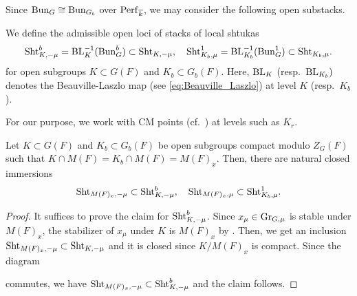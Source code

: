 \documentclass[12pt,reqno]{amsart}
\begin{document}
Since ${\operatorname{Bun}}_G \cong {\operatorname{Bun}}_{G_b}$ over ${\operatorname{Perf}}_{{\overline{k}}}$, we may consider the following open substacks. 

\begin{defi}
    We define the admissible open loci of stacks of local shtukas
    \[
        {\operatorname{Sht}}_{K, -\mu}^b = {\operatorname{BL}}_K^{-1}({\operatorname{Bun}}_G^b) \subset {\operatorname{Sht}}_{K, -\mu}, \quad 
        {\operatorname{Sht}}_{K_b, \mu}^1 = {\operatorname{BL}}_{K_b}^{-1}({\operatorname{Bun}}_G^1) \subset {\operatorname{Sht}}_{K_b, \mu}. 
    \]
    for open subgroups $K \subset G(F)$ and $K_b \subset G_b(F)$. Here, ${\operatorname{BL}}_K$ (resp.\ ${\operatorname{BL}}_{K_b})$ denotes the Beauville-Laszlo map (see \eqref{eq:Beauville_Laszlo}) at level $K$ (resp.\ $K_b$). 
\end{defi}

For our purpose, we work with CM points (cf.\ ) at levels such as $K_r$. 

\begin{lem} \label{lem:CM_points_general_depth}
    Let $K \subset G(F)$ and $K_b \subset G_b(F)$ be open subgroups compact modulo $Z_G(F)$ such that $K \cap M(F) = K_b \cap M(F) = M(F)_x$. Then, there are natural closed immersions
    \[
        {\operatorname{Sht}}_{M(F)_x, -\mu} \subset {\operatorname{Sht}}_{K, -\mu}^b ,\quad 
        {\operatorname{Sht}}_{M(F)_x, \mu} \subset {\operatorname{Sht}}_{K_{b}, \mu}^1. 
    \]
\end{lem}
\begin{proof}
    It suffices to prove the claim for ${\operatorname{Sht}}_{K, -\mu}^b$. Since $x_\mu \in {\operatorname{Gr}}_{G, \mu}$ is stable under $M(F)_x$, the stabilizer of $x_\mu$ under $K$ is $M(F)_x$ by . Then, we get an inclusion ${\operatorname{Sht}}_{M(F)_x, -\mu} \subset {\operatorname{Sht}}_{K, -\mu}$ and it is closed since $K / M(F)_x$ is compact. Since the diagram
    \begin{center}
    \end{center}
    commutes, we have ${\operatorname{Sht}}_{M(F)_x, -\mu} \subset {\operatorname{Sht}}_{K, -\mu}^b$ and the claim follows.
\end{proof}
\end{document}
